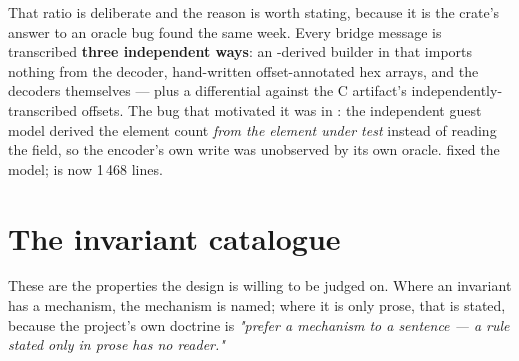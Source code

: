 \documentclass[10.5pt]{article}
\begin{document}
That ratio is deliberate and the reason is worth stating, because it is the crate's answer to an
oracle bug found the same week. Every bridge message is transcribed \textbf{three independent
ways}: an -derived builder in  that imports nothing from
the decoder, hand-written offset-annotated hex arrays, and the decoders themselves — plus a
differential against the C artifact's independently-transcribed offsets. The bug that motivated
it was in : the independent guest model derived the element count
\emph{from the element under test} instead of reading the field, so the encoder's own write was
unobserved by its own oracle.  fixed the model;  is now 1\,468
lines.

\section{The invariant catalogue}

These are the properties the design is willing to be judged on. Where an invariant has a
mechanism, the mechanism is named; where it is only prose, that is stated, because the project's
own doctrine is \emph{"prefer a mechanism to a sentence — a rule stated only in prose has no
reader."}
\end{document}
